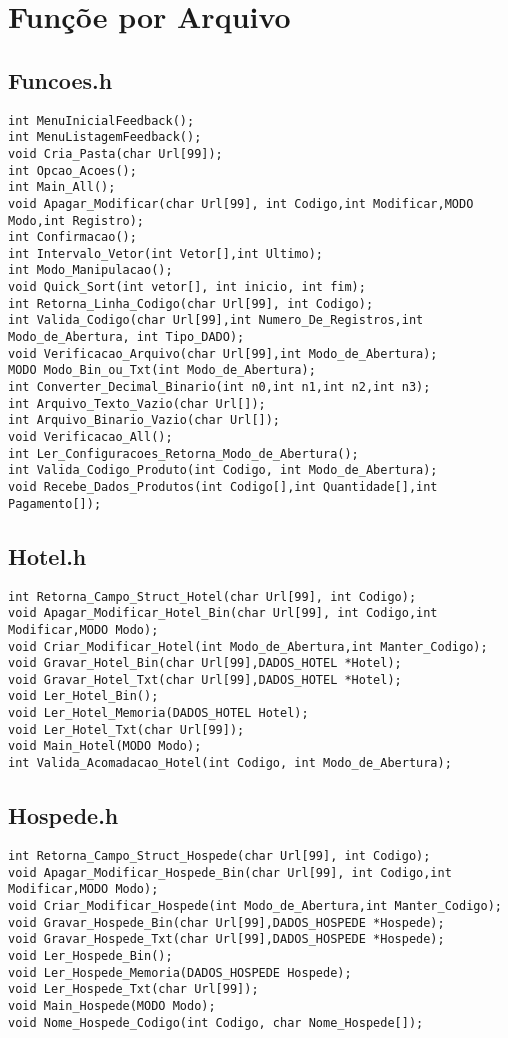 \documentclass{article}
\begin{document}
  \newpage
  \section{Funçõe por Arquivo}


\subsection{Funcoes.h}
\begin{lstlisting}
int MenuInicialFeedback();
int MenuListagemFeedback();
void Cria_Pasta(char Url[99]);
int Opcao_Acoes();
int Main_All();
void Apagar_Modificar(char Url[99], int Codigo,int Modificar,MODO Modo,int Registro);
int Confirmacao();
int Intervalo_Vetor(int Vetor[],int Ultimo);
int Modo_Manipulacao();
void Quick_Sort(int vetor[], int inicio, int fim);
int Retorna_Linha_Codigo(char Url[99], int Codigo);
int Valida_Codigo(char Url[99],int Numero_De_Registros,int Modo_de_Abertura, int Tipo_DADO);
void Verificacao_Arquivo(char Url[99],int Modo_de_Abertura);
MODO Modo_Bin_ou_Txt(int Modo_de_Abertura);
int Converter_Decimal_Binario(int n0,int n1,int n2,int n3);
int Arquivo_Texto_Vazio(char Url[]);
int Arquivo_Binario_Vazio(char Url[]);  
void Verificacao_All();
int Ler_Configuracoes_Retorna_Modo_de_Abertura();
int Valida_Codigo_Produto(int Codigo, int Modo_de_Abertura);
void Recebe_Dados_Produtos(int Codigo[],int Quantidade[],int Pagamento[]);
\end{lstlisting}
\subsection{Hotel.h}
\begin{lstlisting}
int Retorna_Campo_Struct_Hotel(char Url[99], int Codigo);
void Apagar_Modificar_Hotel_Bin(char Url[99], int Codigo,int Modificar,MODO Modo);
void Criar_Modificar_Hotel(int Modo_de_Abertura,int Manter_Codigo);
void Gravar_Hotel_Bin(char Url[99],DADOS_HOTEL *Hotel);
void Gravar_Hotel_Txt(char Url[99],DADOS_HOTEL *Hotel);
void Ler_Hotel_Bin();
void Ler_Hotel_Memoria(DADOS_HOTEL Hotel);
void Ler_Hotel_Txt(char Url[99]);
void Main_Hotel(MODO Modo);
int Valida_Acomadacao_Hotel(int Codigo, int Modo_de_Abertura);
\end{lstlisting}
\subsection{Hospede.h}
\begin{lstlisting}
int Retorna_Campo_Struct_Hospede(char Url[99], int Codigo);
void Apagar_Modificar_Hospede_Bin(char Url[99], int Codigo,int Modificar,MODO Modo);
void Criar_Modificar_Hospede(int Modo_de_Abertura,int Manter_Codigo);
void Gravar_Hospede_Bin(char Url[99],DADOS_HOSPEDE *Hospede);
void Gravar_Hospede_Txt(char Url[99],DADOS_HOSPEDE *Hospede);
void Ler_Hospede_Bin();
void Ler_Hospede_Memoria(DADOS_HOSPEDE Hospede);
void Ler_Hospede_Txt(char Url[99]);
void Main_Hospede(MODO Modo);
void Nome_Hospede_Codigo(int Codigo, char Nome_Hospede[]);
\end{lstlisting}
\end{document}
